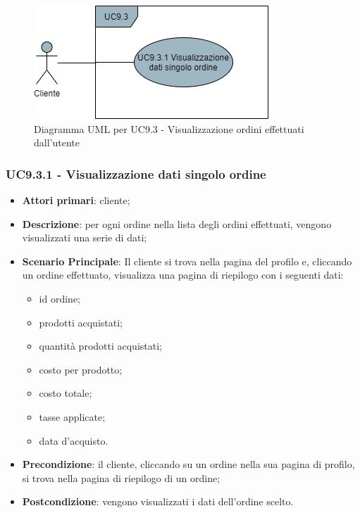 \begin{figure}[H]
\centering
\includegraphics[scale=0.6]{res/UseCase/Immagini/VisualizzazioneOrdini}
\caption{Diagramma UML per UC9.3 - Visualizzazione ordini effettuati dall'utente}
\end{figure}

\subsubsection{UC9.3.1 - Visualizzazione dati singolo ordine}
\begin{itemize}
\item \textbf{Attori primari}: cliente;
\item \textbf{Descrizione}: per ogni ordine nella lista degli ordini effettuati, vengono visualizzati una serie di dati;
\item \textbf{Scenario Principale}: Il cliente si trova nella pagina del profilo e, cliccando un ordine effettuato, visualizza  una pagina di riepilogo con i seguenti dati:
\begin{itemize}
\item id ordine;
\item prodotti acquistati;
\item quantità prodotti acquistati;
\item costo per prodotto;
\item costo totale;
\item tasse applicate;
\item data d'acquisto.
\end{itemize}
\item \textbf{Precondizione}: il cliente, cliccando su un ordine nella sua pagina di profilo, si trova nella pagina di riepilogo di un ordine;
\item \textbf{Postcondizione}: vengono visualizzati i dati dell'ordine scelto.
\end{itemize}

